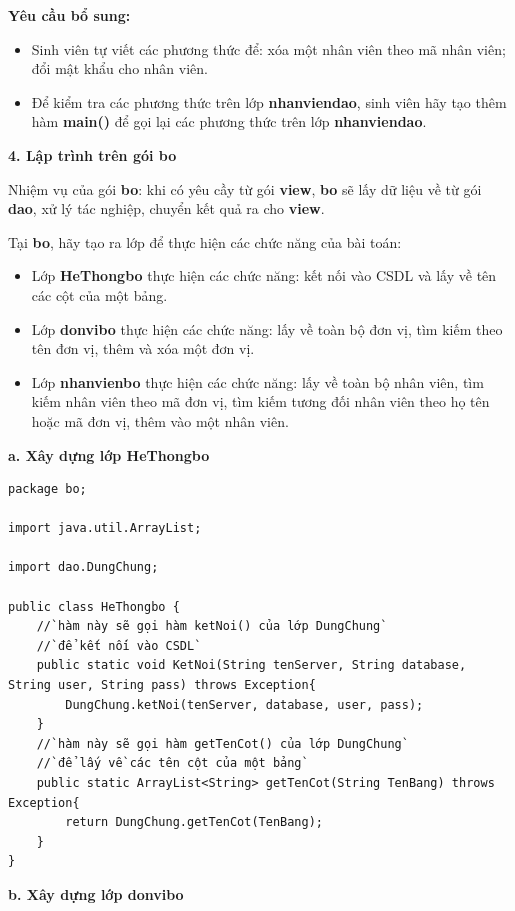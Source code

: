 \textbf{ Yêu cầu bổ sung:}
\begin{itemize}
	\item Sinh viên tự viết các phương thức để: xóa một nhân viên theo mã  nhân viên; đổi mật khẩu cho nhân viên.
	\item Để kiểm tra các phương thức trên lớp \textbf{nhanviendao}, sinh viên hãy tạo thêm hàm \textbf{main()} để gọi lại các phương thức trên lớp \textbf{nhanviendao}.\\
\end{itemize}
\textbf{4. Lập trình trên gói bo}

Nhiệm vụ của gói \textbf{bo}: khi có yêu cầy từ gói \textbf{view}, \textbf{bo} sẽ lấy dữ liệu về từ gói \textbf{dao}, xử lý tác nghiệp, chuyển kết quả ra cho \textbf{view}.

Tại \textbf{bo}, hãy tạo ra lớp để thực hiện các chức năng của bài toán: 
\begin{itemize}
	\item Lớp \textbf{HeThongbo} thực hiện các chức năng: kết nối vào CSDL và lấy về tên các cột của một bảng.
	\item Lớp \textbf{donvibo} thực hiện các chức năng: lấy về toàn bộ đơn vị, tìm kiếm theo tên đơn vị, thêm và xóa một đơn vị.
	\item Lớp \textbf{nhanvienbo} thực hiện các chức năng: lấy về toàn bộ nhân viên, tìm kiếm nhân viên theo mã đơn vị, tìm kiếm tương đối nhân viên theo họ tên hoặc mã đơn vị, thêm vào một nhân viên.
\end{itemize}
\textbf{a. Xây dựng lớp HeThongbo}
\begin{lstlisting}[escapechar=`]
package bo;

import java.util.ArrayList;

import dao.DungChung;

public class HeThongbo {
	//`hàm này sẽ gọi hàm ketNoi() của lớp DungChung`
	//`để kết nối vào CSDL`
	public static void KetNoi(String tenServer, String database, String user, String pass) throws Exception{
		DungChung.ketNoi(tenServer, database, user, pass);
	}
	//`hàm này sẽ gọi hàm getTenCot() của lớp DungChung`
	//`để lấy về các tên cột của một bảng`
	public static ArrayList<String> getTenCot(String TenBang) throws Exception{
		return DungChung.getTenCot(TenBang);
	}
}
\end{lstlisting}
\textbf{b. Xây dựng lớp donvibo}

